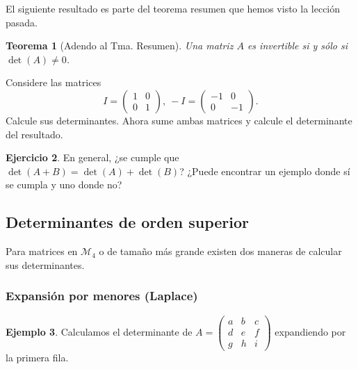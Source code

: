 \documentclass[12pt]{article}
\theoremstyle{plain}
\newtheorem{Th}{Teorema}  %
\theoremstyle{definition}
\newtheorem{Ex}[Th]{Ejemplo}           %
\newtheorem{Ej}[Th]{Ejercicio}         %
\theoremstyle{remark}
\newcommand{\cM}{\mathcal{M}}       %
\renewcommand{\:}{\colon}           %
\renewcommand{\.}{\Cdot}                %
\begin{document}
\begin{multicols}{2}
El siguiente resultado es parte del teorema resumen que hemos visto la lección pasada.

\begin{Th}[Adendo al Tma. Resumen]
Una matriz $A$ es invertible si y sólo si $\det(A)\neq 0$.
\end{Th}

\begin{ptcbP} 
Considere las matrices $$I=\begin{pmatrix}
  1&0\\0&1
\end{pmatrix},\ -I=\begin{pmatrix}
  -1&0\\0&-1
\end{pmatrix}.$$ 
Calcule sus determinantes. Ahora sume ambas matrices y calcule el determinante del resultado.
\end{ptcbP}
\begin{Ej} 
  En general, ¿se cumple que $\det(A+B)=\det(A)+\det(B)$? ¿Puede encontrar un ejemplo donde sí se cumpla y uno donde no?
\end{Ej}


\subsection*{Determinantes de orden superior}

Para matrices en $\cM_4$ o de tamaño más grande existen dos maneras de calcular sus determinantes.

\subsubsection*{Expansión por menores (Laplace)}

\begin{Ex}
Calculamos el determinante de $A=\begin{pmatrix}
  a&b&c\\d&e&f\\g&h&i
\end{pmatrix}$ expandiendo por la primera fila. 


\end{Ex}
\end{multicols}
\end{document}
